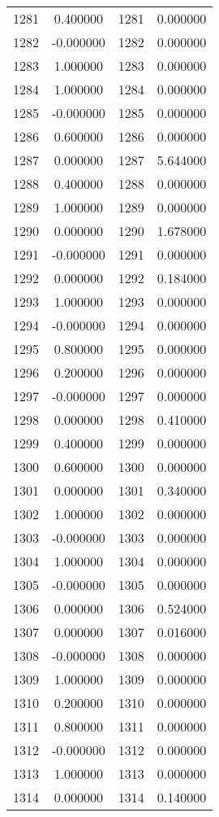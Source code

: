 \documentclass[12pt]{article}
\begin{document}
\begin{longtable}{@{}cccc@{}}
1281 & 0.400000 & 1281 & 0.000000 \\
1282 & -0.000000 & 1282 & 0.000000 \\
1283 & 1.000000 & 1283 & 0.000000 \\
1284 & 1.000000 & 1284 & 0.000000 \\
1285 & -0.000000 & 1285 & 0.000000 \\
1286 & 0.600000 & 1286 & 0.000000 \\
1287 & 0.000000 & 1287 & 5.644000 \\
1288 & 0.400000 & 1288 & 0.000000 \\
1289 & 1.000000 & 1289 & 0.000000 \\
1290 & 0.000000 & 1290 & 1.678000 \\
1291 & -0.000000 & 1291 & 0.000000 \\
1292 & 0.000000 & 1292 & 0.184000 \\
1293 & 1.000000 & 1293 & 0.000000 \\
1294 & -0.000000 & 1294 & 0.000000 \\
1295 & 0.800000 & 1295 & 0.000000 \\
1296 & 0.200000 & 1296 & 0.000000 \\
1297 & -0.000000 & 1297 & 0.000000 \\
1298 & 0.000000 & 1298 & 0.410000 \\
1299 & 0.400000 & 1299 & 0.000000 \\
1300 & 0.600000 & 1300 & 0.000000 \\
1301 & 0.000000 & 1301 & 0.340000 \\
1302 & 1.000000 & 1302 & 0.000000 \\
1303 & -0.000000 & 1303 & 0.000000 \\
1304 & 1.000000 & 1304 & 0.000000 \\
1305 & -0.000000 & 1305 & 0.000000 \\
1306 & 0.000000 & 1306 & 0.524000 \\
1307 & 0.000000 & 1307 & 0.016000 \\
1308 & -0.000000 & 1308 & 0.000000 \\
1309 & 1.000000 & 1309 & 0.000000 \\
1310 & 0.200000 & 1310 & 0.000000 \\
1311 & 0.800000 & 1311 & 0.000000 \\
1312 & -0.000000 & 1312 & 0.000000 \\
1313 & 1.000000 & 1313 & 0.000000 \\
1314 & 0.000000 & 1314 & 0.140000 \\

\end{longtable}
\end{document}
